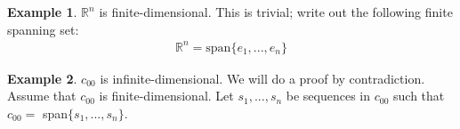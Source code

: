 \documentclass[11pt]{scrartcl}
\newcommand{\R}[0]{\mathbb{R}}
\theoremstyle{definition}
\newtheorem{ex}{Example}
\theoremstyle{remark}
\begin{document}
\begin{ex}
	$\R^n$ is finite-dimensional. This is trivial; write out the following finite spanning set: 
	\begin{align*}
		\R^n = \text{span} \{ e_1, ..., e_n \} 
	\end{align*}	
\end{ex}


\begin{ex}
	$c_{00}$ is infinite-dimensional. We will do a proof by contradiction. Assume that $c_{00}$ is finite-dimensional. Let $s_1, ..., s_n$ be sequences in $c_{00}$ such that $c_{00} =$ span$\{ s_1, ..., s_n \}$. 
\end{ex}
\end{document}
